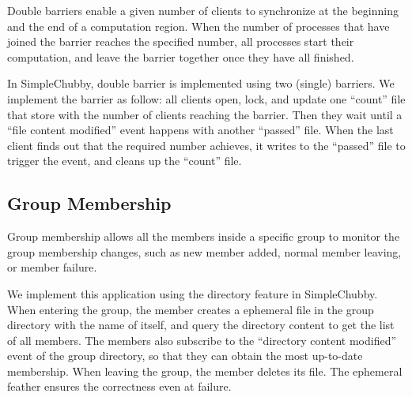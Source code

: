 Double barriers enable a given number of clients to synchronize at the
beginning and the end of a computation region. When the number of processes
that have joined the barrier reaches the specified number, all processes
start their computation, and leave the barrier together once they have all
finished.

In SimpleChubby, double barrier is implemented using two (single) barriers.
We implement the barrier as follow: all clients open, lock, and update
one ``count'' file that store with the number of clients reaching the barrier.
Then they wait until a ``file content modified'' event happens with another
``passed'' file. When the last client finds out that the required number
achieves, it writes to the ``passed'' file to trigger the event, and cleans
up the ``count'' file.

\subsection{Group Membership}

Group membership allows all the members inside a specific group to monitor
the group membership changes, such as new member added, normal member leaving,
or member failure.

We implement this application using the directory feature in SimpleChubby.
When entering the group, the member creates a ephemeral file in the group
directory with the name of itself, and query the directory content to get
the list of all members. The members also subscribe to the ``directory content
modified'' event of the group directory, so that they can obtain the most
up-to-date membership. When leaving the group, the member deletes its file.
The ephemeral feather ensures the correctness even at failure.



